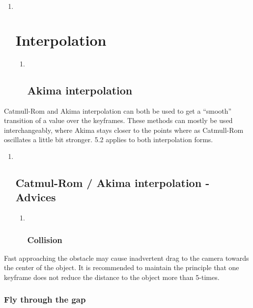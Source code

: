\begin{enumerate}
\def\labelenumi{\arabic{enumi}.}
\item ~
  \section{Interpolation}\label{interpolation}

  \begin{enumerate}
  \def\labelenumii{\arabic{enumii}.}
  \item ~
    \subsection{Akima interpolation}\label{akima-interpolation}
  \end{enumerate}
\end{enumerate}

Catmull-Rom and Akima interpolation can both be used to get a ``smooth''
transition of a value over the keyframes. These methods can mostly be
used interchangeably, where Akima stays closer to the points where as
Catmull-Rom oscillates a little bit stronger. 5.2 applies to both
interpolation forms.

\begin{enumerate}
\def\labelenumi{\arabic{enumi}.}
\item ~
  \subsection{Catmul-Rom / Akima interpolation -
  Advices}\label{catmul-rom-akima-interpolation---advices}

  \begin{enumerate}
  \def\labelenumii{\alph{enumii}.}
  \item ~
    \subsubsection{Collision}\label{collision}
  \end{enumerate}
\end{enumerate}

Fast approaching the obstacle may cause inadvertent drag to the camera
towards the center of the object. It is recommended to maintain the
principle that one keyframe does not reduce the distance to the object
more than 5-times.

\subsubsection{Fly through the gap}\label{fly-through-the-gap}

